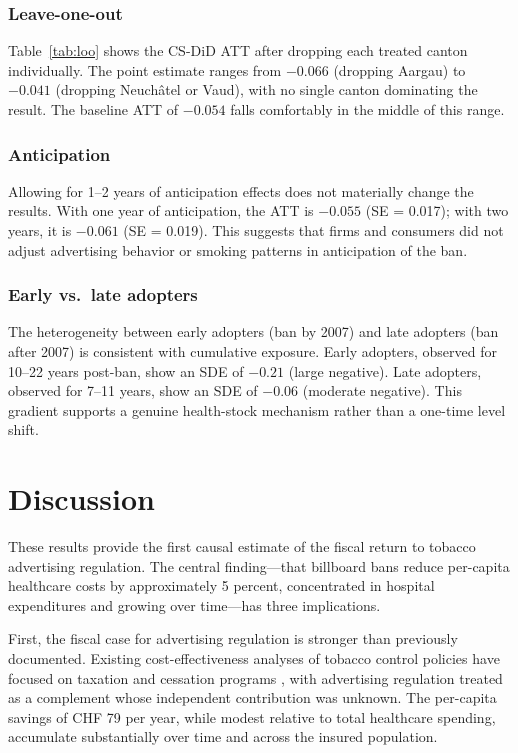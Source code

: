 \documentclass[12pt]{article}
\begin{document}
\subsubsection*{Leave-one-out} Table~\ref{tab:loo} shows the CS-DiD ATT after dropping each treated canton individually. The point estimate ranges from $-0.066$ (dropping Aargau) to $-0.041$ (dropping Neuch\^{a}tel or Vaud), with no single canton dominating the result. The baseline ATT of $-0.054$ falls comfortably in the middle of this range.

\subsubsection*{Anticipation} Allowing for 1--2 years of anticipation effects does not materially change the results. With one year of anticipation, the ATT is $-0.055$ (SE = 0.017); with two years, it is $-0.061$ (SE = 0.019). This suggests that firms and consumers did not adjust advertising behavior or smoking patterns in anticipation of the ban.

\subsubsection*{Early vs.\ late adopters} The heterogeneity between early adopters (ban by 2007) and late adopters (ban after 2007) is consistent with cumulative exposure. Early adopters, observed for 10--22 years post-ban, show an SDE of $-0.21$ (large negative). Late adopters, observed for 7--11 years, show an SDE of $-0.06$ (moderate negative). This gradient supports a genuine health-stock mechanism rather than a one-time level shift.


\section{Discussion}

These results provide the first causal estimate of the fiscal return to tobacco advertising regulation. The central finding---that billboard bans reduce per-capita healthcare costs by approximately 5 percent, concentrated in hospital expenditures and growing over time---has three implications.

First, the fiscal case for advertising regulation is stronger than previously documented. Existing cost-effectiveness analyses of tobacco control policies have focused on taxation \citep{chaloupka2000economics} and cessation programs \citep{cromwell1997cost}, with advertising regulation treated as a complement whose independent contribution was unknown. The per-capita savings of CHF 79 per year, while modest relative to total healthcare spending, accumulate substantially over time and across the insured population.
\end{document}
